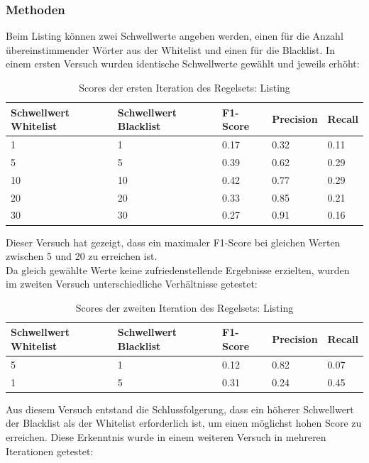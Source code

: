 \subsubsection{Methoden}
Beim Listing können zwei Schwellwerte angeben werden, einen für die Anzahl übereinstimmender Wörter aus der Whitelist und einen für die Blacklist.
In einem ersten Versuch wurden identische Schwellwerte gewählt und jeweils erhöht:\\
\begin{table}[H]
	\caption{Scores der ersten Iteration des Regelsets: Listing}
	\centering
	\begin{tabular}{|l|l|l|l|l|}
		\hline
		Schwellwert Whitelist & Schwellwert Blacklist & F1-Score & Precision & Recall\\
		\hline
		1 & 1 & 0.17 & 0.32 & 0.11 \\
		5 & 5 & 0.39 & 0.62 & 0.29 \\
		10 & 10 & 0.42 & 0.77 & 0.29 \\
		20 & 20 & 0.33 & 0.85 & 0.21 \\
		30 & 30 & 0.27 & 0.91 & 0.16 \\
		\hline
	\end{tabular}
\end{table}
Dieser Versuch hat gezeigt, dass ein maximaler F1-Score bei gleichen Werten zwischen 5 und 20 zu erreichen ist.\\
Da gleich gewählte Werte keine zufriedenstellende Ergebnisse erzielten, wurden im zweiten Versuch unterschiedliche Verhältnisse getestet:\\
\begin{table}[H]
	\caption{Scores der zweiten Iteration des Regelsets: Listing}
	\centering
	\begin{tabular}{|l|l|l|l|l|}
		\hline
		Schwellwert Whitelist & Schwellwert Blacklist & F1-Score & Precision & Recall\\
		\hline
		5 & 1 & 0.12 & 0.82 & 0.07 \\
		1 & 5 & 0.31 & 0.24 & 0.45 \\
		\hline
	\end{tabular}
\end{table}
Aus diesem Versuch entstand die Schlussfolgerung, dass ein höherer Schwellwert der Blacklist als der Whitelist erforderlich ist, um einen möglichst hohen Score zu erreichen.
Diese Erkenntnis wurde in einem weiteren Versuch in mehreren Iterationen getestet:\\
